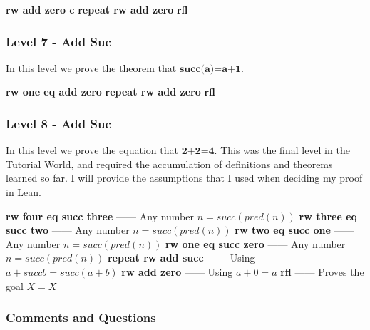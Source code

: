 \documentclass{article}
\theoremstyle{theorem}
\theoremstyle{definition}
\theoremstyle{remark}
\begin{document}
  \bgroup\obeylines
  \qquad \textbf{rw add zero c}
  \qquad \textbf{repeat rw add zero}
  \qquad \textbf{rfl}
  \egroup

  \subsubsection*{Level 7 - Add Suc}
  In this level we prove the theorem that $\textbf{succ(a)=a+1}$.

  \bgroup\obeylines
  \qquad \textbf{rw one eq add zero}
  \qquad \textbf{repeat rw add zero}
  \qquad \textbf{rfl}
  \egroup

  \subsubsection*{Level 8 - Add Suc}
  In this level we prove the equation that $\textbf{2+2=4}$. This was the final level in the Tutorial World, and required the accumulation of definitions and theorems learned so far. I will provide the assumptions that I used when deciding my proof in Lean.

  \bgroup\obeylines
  \qquad \textbf{rw four eq succ three} —— Any number $n = succ(pred(n))$
  \qquad \textbf{rw three eq succ two}  —— Any number $n = succ(pred(n))$
  \qquad \textbf{rw two eq succ one}    —— Any number $n = succ(pred(n))$
  \qquad \textbf{rw one eq succ zero}   —— Any number $n = succ(pred(n))$
  \qquad \textbf{repeat rw add succ}    —— Using $a + succ b = succ (a + b)$
  \qquad \textbf{rw add zero}           —— Using $a + 0 = a$
  \qquad \textbf{rfl}                   —— Proves the goal $X = X$

  \egroup

%
%

\subsubsection*{Comments and Questions}
\end{document}
